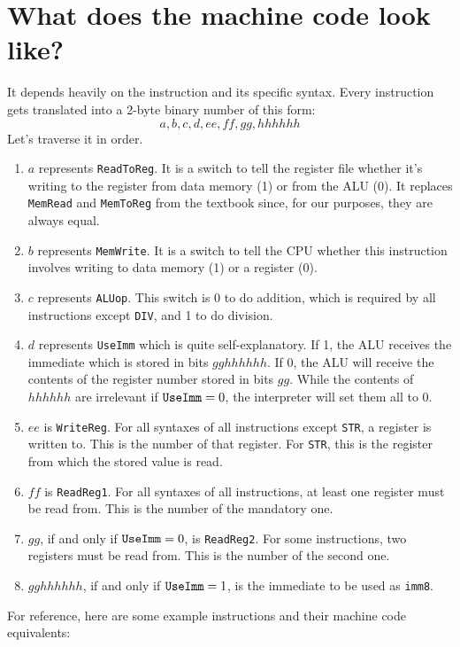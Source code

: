 \documentclass[12pt, oneside]{memoir}
\newcommand{\imm}{{\color{imm}\texttt{imm8}}}
\newcommand{\instruction}[1]{{\color{instruction}\texttt{#1}}}
\begin{document}
\section{What does the machine code look like?}
It depends heavily on the instruction and its specific syntax. Every instruction gets translated into a 2-byte binary number of this form:
\begin{equation*}
    a,b,c,d,ee,ff,gg,hhhhhh
\end{equation*}
Let's traverse it in order.
\begin{enumerate}
    \item $a$ represents \texttt{ReadToReg}. It is a switch to tell the register file whether it's writing to the register from data memory (1) or from the ALU (0). It replaces \texttt{MemRead} and \texttt{MemToReg} from the textbook since, for our purposes, they are always equal.
    \item $b$ represents \texttt{MemWrite}. It is a switch to tell the CPU whether this instruction involves writing to data memory (1) or a register (0).
    \item $c$ represents \texttt{ALUop}. This switch is 0 to do addition, which is required by all instructions except \instruction{DIV}, and 1 to do division.
    \item $d$ represents \texttt{UseImm} which is quite self-explanatory. If 1, the ALU receives the immediate which is stored in bits $gghhhhhh$. 
    If 0, the ALU will receive the contents of the register number stored in bits $gg$. While the contents of $hhhhhh$ are irrelevant if $\text{\texttt{UseImm}} = 0$, the interpreter will set them all to 0.
    \item $ee$ is \texttt{WriteReg}. For all syntaxes of all instructions except \instruction{STR}, a register is written to. This is the number of that register. For \instruction{STR}, this is the register from which the stored value is read.
    \item $ff$ is \texttt{ReadReg1}. For all syntaxes of all instructions, at least one register must be read from. This is the number of the mandatory one.
    \item $gg$, if and only if $\text{\texttt{UseImm}} = 0$, is \texttt{ReadReg2}. For some instructions, two registers must be read from. This is the number of the second one.
    \item $gghhhhhh$, if and only if $\text{\texttt{UseImm}} = 1$, is the immediate to be used as \imm.
\end{enumerate}
For reference, here are some example instructions and their machine code equivalents:
\end{document}
